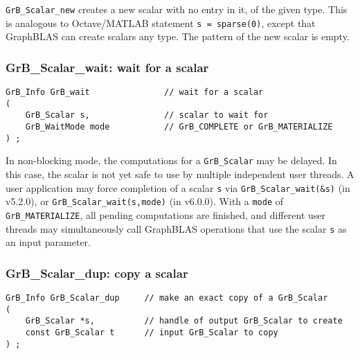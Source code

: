 \documentclass[12pt]{article}
\begin{document}
{\verb'GrB_Scalar_new' creates a new scalar with no
entry in it, of the given type.  This is analogous to Octave/MATLAB statement
\verb's = sparse(0)', except that GraphBLAS can create scalars any
type.  The pattern of the new scalar is empty.

\subsubsection{{\sf GrB\_Scalar\_wait:} wait for a scalar}
\label{scalar_wait}

\begin{mdframed}[userdefinedwidth=6in]
{\footnotesize
\begin{verbatim}
GrB_Info GrB_wait               // wait for a scalar
(
    GrB_Scalar s,               // scalar to wait for
    GrB_WaitMode mode           // GrB_COMPLETE or GrB_MATERIALIZE
) ;
\end{verbatim}
}\end{mdframed}

In non-blocking mode, the computations for a \verb'GrB_Scalar' may be delayed.
In this case, the scalar is not yet safe to use by multiple independent user
threads.  A user application may force completion of a scalar \verb's' via
\verb'GrB_Scalar_wait(&s)' (in v5.2.0), or
\verb'GrB_Scalar_wait(s,mode)' (in v6.0.0).
With a \verb'mode' of \verb'GrB_MATERIALIZE',
all pending computations are finished, and different user threads may
simultaneously call GraphBLAS operations that use the scalar \verb's' as an
input parameter.

\newpage
\subsubsection{{\sf GrB\_Scalar\_dup:} copy a scalar}
\label{scalar_dup}

\begin{mdframed}[userdefinedwidth=6in]
{\footnotesize
\begin{verbatim}
GrB_Info GrB_Scalar_dup     // make an exact copy of a GrB_Scalar
(
    GrB_Scalar *s,          // handle of output GrB_Scalar to create
    const GrB_Scalar t      // input GrB_Scalar to copy
) ;
\end{verbatim}
} \end{mdframed}

}
\end{document}
